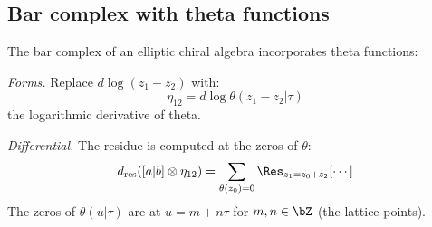\subsection{Bar complex with theta functions}

\begin{construction}\label{constr:elliptic-bar}
The bar complex of an elliptic chiral algebra incorporates theta functions:

\emph{Forms.} Replace $d\log(z_1 - z_2)$ with:
\[
\eta_{12} = d\log\theta(z_1 - z_2 | \tau)
\]
the logarithmic derivative of theta.

\emph{Differential.} The residue is computed at the zeros of $\theta$:
\[
d_{\text{res}}([a|b] \otimes \eta_{12}) = \sum_{\theta(z_0) = 0} \Res_{z_1 = z_0 + z_2}[\cdots]
\]
The zeros of $\theta(u|\tau)$ are at $u = m + n\tau$ for $m, n \in \bZ$ (the lattice points).
\end{construction}

